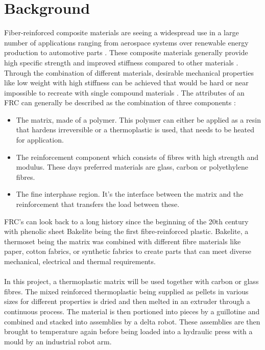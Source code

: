 
\chapter{Background}

Fiber-reinforced composite materials are seeing a widespread use in a large number of applications ranging from aerospace systems over renewable energy production to automotive parts \cite{park2011interface} \cite{HighPerformanceTextiles}. 
These composite materials generally provide high specific strength and improved stiffness compared to other materials \cite{GeneralizedContinuumMechanics}. 
Through the combination of different materials, desirable mechanical properties like low weight with high stiffness can be achieved that would be hard or near impossible to recreate with single compound materials \cite{AdvancesDamageMechanics}. 
The attributes of an FRC can generally be described as the combination of three components \cite{AdvancedDentalBiomaterials}: \\
\begin{itemize}
	\item The matrix, made of a polymer. 
	This polymer can either be applied as a resin that hardens irreversible or a thermoplastic is used, that needs to be heated for application.
	\item The reinforcement component which consists of fibres with high strength and modulus. 
	These days preferred materials are glass, carbon or polyethylene fibres.
	\item The fine interphase region. 
	It's the interface between the matrix and the reinforcement that transfers the load between these.	
\end{itemize}
%
FRC's can look back to a long history since the beginning of the 20th century with phenolic sheet Bakelite being the first fibre-reinforced plastic. 
Bakelite, a thermoset being the matrix was combined with different fibre materials like paper, cotton fabrics, or synthetic fabrics to create parts that can meet diverse mechanical, electrical and thermal requirements.
\cite{BakelitePhenolics}\\
\\
In this project, a thermoplastic matrix will be used together with carbon or glass fibres. 
The mixed reinforced thermoplastic being supplied as pellets in various sizes for different properties is dried and then melted in an extruder through a continuous process. 
The material is then portioned into pieces by a guillotine and combined and stacked into assemblies by a delta robot. 
These assemblies are then brought to temperature again before being loaded into a hydraulic press with a mould by an industrial robot arm.
\cite{SystemRequirements}







